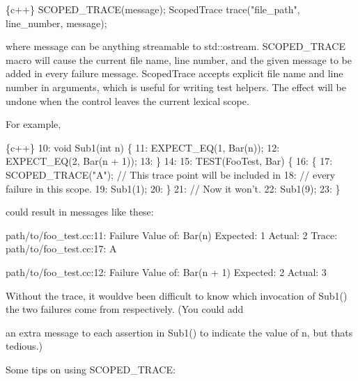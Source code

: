 \begin{DoxyCode}
\{c++\}
SCOPED\_TRACE(message);
ScopedTrace trace("file\_path", line\_number, message);
\end{DoxyCode}


where {\ttfamily message} can be anything streamable to {\ttfamily std\+::ostream}. {\ttfamily S\+C\+O\+P\+E\+D\+\_\+\+T\+R\+A\+CE} macro will cause the current file name, line number, and the given message to be added in every failure message. {\ttfamily Scoped\+Trace} accepts explicit file name and line number in arguments, which is useful for writing test helpers. The effect will be undone when the control leaves the current lexical scope.

For example,


\begin{DoxyCode}
\{c++\}
10: void Sub1(int n) \{
11:   EXPECT\_EQ(1, Bar(n));
12:   EXPECT\_EQ(2, Bar(n + 1));
13: \}
14:
15: TEST(FooTest, Bar) \{
16:   \{
17:     SCOPED\_TRACE("A");  // This trace point will be included in
18:                         // every failure in this scope.
19:     Sub1(1);
20:   \}
21:   // Now it won't.
22:   Sub1(9);
23: \}
\end{DoxyCode}


could result in messages like these\+:


\begin{DoxyCode}
path/to/foo\_test.cc:11: Failure
Value of: Bar(n)
Expected: 1
  Actual: 2
   Trace:
path/to/foo\_test.cc:17: A

path/to/foo\_test.cc:12: Failure
Value of: Bar(n + 1)
Expected: 2
  Actual: 3
\end{DoxyCode}


Without the trace, it would\textquotesingle{}ve been difficult to know which invocation of {\ttfamily Sub1()} the two failures come from respectively. (You could add

an extra message to each assertion in {\ttfamily Sub1()} to indicate the value of {\ttfamily n}, but that\textquotesingle{}s tedious.)

Some tips on using {\ttfamily S\+C\+O\+P\+E\+D\+\_\+\+T\+R\+A\+CE}\+:


